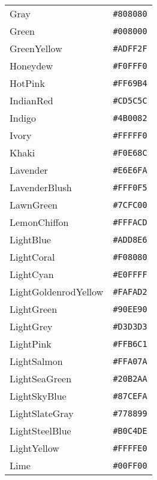 \documentclass[a4paper]{article}
\begin{document}
\begin{longtable}{|l|r|}
Gray & \texttt{\#808080} \cellcolor[HTML]{808080} \\
Green & \texttt{\#008000} \cellcolor[HTML]{008000} \\
GreenYellow & \texttt{\#ADFF2F} \cellcolor[HTML]{ADFF2F} \\
Honeydew & \texttt{\#F0FFF0} \cellcolor[HTML]{F0FFF0} \\
HotPink & \texttt{\#FF69B4} \cellcolor[HTML]{FF69B4} \\
IndianRed & \texttt{\#CD5C5C} \cellcolor[HTML]{CD5C5C} \\
Indigo & \texttt{\#4B0082} \cellcolor[HTML]{4B0082} \\
Ivory & \texttt{\#FFFFF0} \cellcolor[HTML]{FFFFF0} \\
Khaki & \texttt{\#F0E68C} \cellcolor[HTML]{F0E68C} \\
Lavender & \texttt{\#E6E6FA} \cellcolor[HTML]{E6E6FA} \\
LavenderBlush & \texttt{\#FFF0F5} \cellcolor[HTML]{FFF0F5} \\
LawnGreen & \texttt{\#7CFC00} \cellcolor[HTML]{7CFC00} \\
LemonChiffon & \texttt{\#FFFACD} \cellcolor[HTML]{FFFACD} \\
LightBlue & \texttt{\#ADD8E6} \cellcolor[HTML]{ADD8E6} \\
LightCoral & \texttt{\#F08080} \cellcolor[HTML]{F08080} \\
LightCyan & \texttt{\#E0FFFF} \cellcolor[HTML]{E0FFFF} \\
LightGoldenrodYellow & \texttt{\#FAFAD2} \cellcolor[HTML]{FAFAD2} \\
LightGreen & \texttt{\#90EE90} \cellcolor[HTML]{90EE90} \\
LightGrey & \texttt{\#D3D3D3} \cellcolor[HTML]{D3D3D3} \\
LightPink & \texttt{\#FFB6C1} \cellcolor[HTML]{FFB6C1} \\
LightSalmon & \texttt{\#FFA07A} \cellcolor[HTML]{FFA07A} \\
LightSeaGreen & \texttt{\#20B2AA} \cellcolor[HTML]{20B2AA} \\
LightSkyBlue & \texttt{\#87CEFA} \cellcolor[HTML]{87CEFA} \\
LightSlateGray & \texttt{\#778899} \cellcolor[HTML]{778899} \\
LightSteelBlue & \texttt{\#B0C4DE} \cellcolor[HTML]{B0C4DE} \\
LightYellow & \texttt{\#FFFFE0} \cellcolor[HTML]{FFFFE0} \\
Lime & \texttt{\#00FF00} \cellcolor[HTML]{00FF00} \\

\end{longtable}
\end{document}
